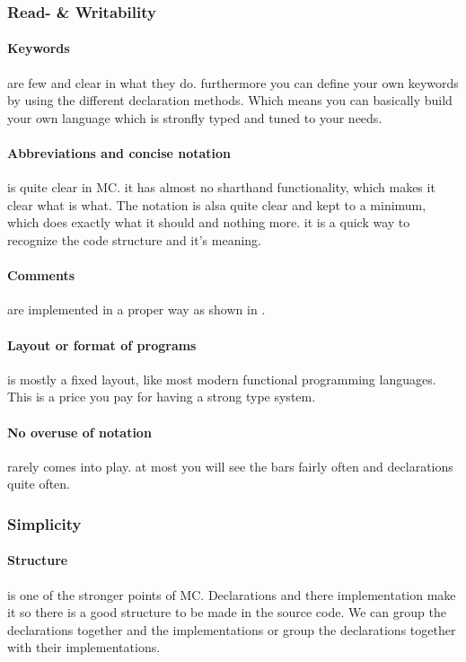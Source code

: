\begin{multicols}{2}

\subsubsection{Read- \& Writability}
\paragraph{Keywords}
are few and clear in what they do.
furthermore you can define your own keywords by using the different declaration methods.\cite{sectionstuff}
Which means you can basically build your own language which is stronfly typed and tuned to your needs.

\paragraph{Abbreviations and concise notation}
is quite clear in MC.
it has almost no sharthand functionality, which makes it clear what is what.
The notation is alsa quite clear and kept to a minimum, which does exactly what it should and nothing more.
it is a quick way to recognize the code structure and it's meaning.

\paragraph{Comments}
are implemented in a proper way as shown in \cite{sectionstuff}.

\paragraph{Layout or format of programs}
is mostly a fixed layout, like most modern functional programming languages.
This is a price you pay for having a strong type system.

\paragraph{No overuse of notation}
rarely comes into play.
at most you will see the bars fairly often and declarations quite often.

\subsubsection{Simplicity}
\paragraph{Structure}
is one of the stronger points of MC.
Declarations and there implementation make it so there is a good structure to be made in the source code.
We can group the declarations together and the implementations or group the declarations together with their implementations.


\end{multicols}
